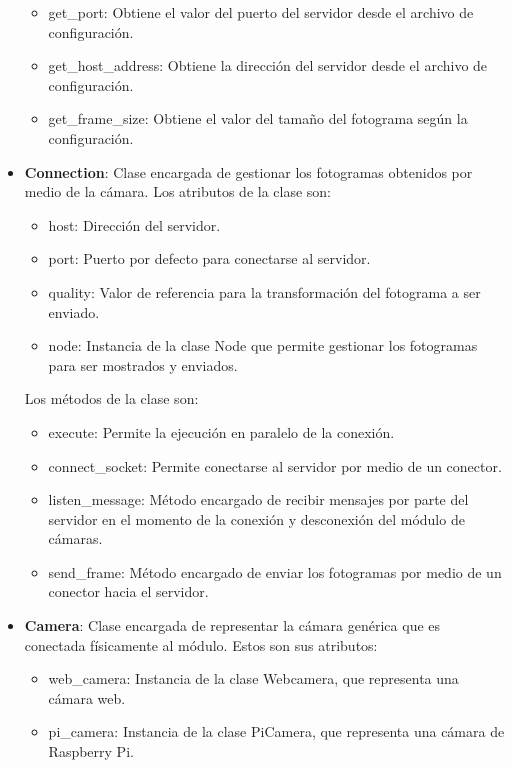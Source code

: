 \begin{itemize}
        \begin{itemize}
            \item get\_port: Obtiene el valor del puerto del servidor desde el archivo de configuración.
            \item get\_host\_address: Obtiene la dirección del servidor desde el archivo de configuración.
            \item get\_frame\_size: Obtiene el valor del tamaño del fotograma según la configuración.
        \end{itemize}
    \item \textbf{Connection}: Clase encargada de gestionar los fotogramas obtenidos por medio de la cámara. Los atributos de la clase son:
        \begin{itemize}
            \item host: Dirección del servidor.
            \item port: Puerto por defecto para conectarse al servidor.
            \item quality: Valor de referencia para la transformación del fotograma a ser enviado.
            \item node: Instancia de la clase Node  que permite gestionar los fotogramas para ser mostrados y enviados.
        \end{itemize}
        Los métodos de la clase son:
        \begin{itemize}
            \item execute: Permite la ejecución en paralelo de la conexión.
            \item connect\_socket: Permite conectarse al servidor por medio de un conector.
            \item listen\_message: Método encargado de recibir mensajes por parte del servidor en el momento de la conexión y desconexión del módulo de cámaras.
            \item send\_frame: Método encargado de enviar los fotogramas por medio de un conector hacia el servidor.
        \end{itemize}
    \item \textbf{Camera}: Clase encargada de representar la cámara genérica que es conectada físicamente al módulo. Estos son sus atributos:
        \begin{itemize}
            \item web\_camera: Instancia de la clase Webcamera, que representa una cámara web.
            \item pi\_camera: Instancia de la clase PiCamera, que representa una cámara de Raspberry Pi.

\end{itemize}
\end{itemize}
